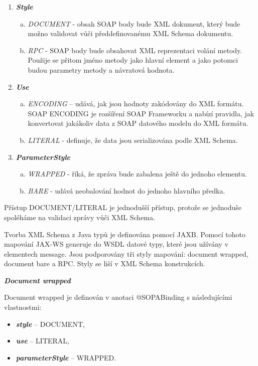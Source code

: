 \documentclass[11pt,twoside,a4paper]{book}
\begin{document}
\begin{enumerate}
  \item \textbf{\textit{Style}}
  	\begin{enumerate}[(a)]
  	  \item \textit{DOCUMENT} - obsah SOAP body bude XML dokument, který
  	  bude možno validovat vůči předdefinovanému XML Schema dokumentu.
  	  \item \textit{RPC} - SOAP body bude obsahovat XML reprezentaci volání
  	  metody.
Použije se přitom jméno metody jako hlavní element a jako potomci budou
parametry metody a návratová hodnota.
	\end{enumerate}
  \item \textbf{\textit{Use}}
	\begin{enumerate}[(a)]
	  \item \textit{ENCODING} – udává, jak jsou hodnoty zakódovány do XML
	  formátu.
SOAP ENCODING je rozšíření SOAP Frameworku a nabízí pravidla, jak
konvertovat jakákoliv data z SOAP datového modelu do XML formátu.
	  \item \textit{LITERAL} - definuje, že data jsou serializována podle
	  XML Schema.
	\end{enumerate}
  \item \textbf{\textit{ParameterStyle}} 
	\begin{enumerate}[(a)]
	  \item \textit{WRAPPED} - říká, že zpráva bude zabalena ještě do
	  jednoho elementu.
	  \item \textit{BARE} - udává neobalování hodnot do jednoho hlavního
	  předka.
	\end{enumerate}
\end{enumerate}

Přístup DOCUMENT/LITERAL je jednodušší přístup, protože se jednoduše spoléháme na
validaci zprávy vůči XML Schema.

Tvorba XML Schema z Java typů je definována pomocí JAXB. Pomocí tohoto mapování
JAX-WS generuje do WSDL datové typy, které jsou užívány v elementech message. Jsou
podporovány tři styly mapování: document wrapped, document bare a RPC. Styly se liší v
XML Schema konstrukcích.

\textbf{\textit{Document wrapped}}

Document wrapped je definován v anotaci @SOPABinding s následujícími vlastnostmi:

\begin{itemize}
  \item \textbf{\textit{style}} – DOCUMENT,
  \item \textbf{\textit{use}} – LITERAL,
  \item \textbf{\textit{parameterStyle}} – WRAPPED.
\end{itemize}
\end{document}

